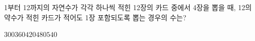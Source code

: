 1부터 12까지의 자연수가 각각 하나씩 적힌 12장의 카드 중에서 4장을 뽑을 때, 12의 약수가 적힌 카드가 적어도 1장 포함되도록 뽑는 경우의 수는?
\begin{choices32}{$300$}{$360$}{$420$}{$480$}{$540$}\end{choices32}
